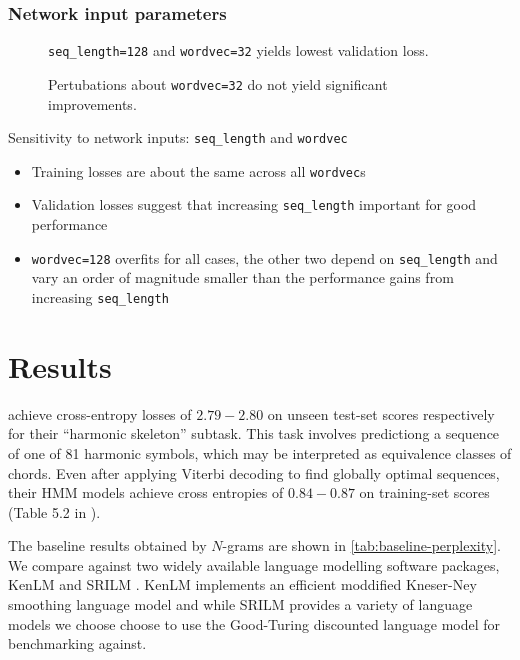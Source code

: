 \subsubsection{Network input parameters}


\begin{figure}[tb]
    \centering
    
    \caption{\texttt{seq\_length=128} and \texttt{wordvec=32} yields lowest validation loss.}
    \label{fig:torch-rnn-input-params}
\end{figure}

\begin{figure}[tb]
  \centering
  
  \caption{Pertubations about \texttt{wordvec=32} do not yield significant improvements.}
  \label{fig:torch-rnn-input-params-wordvec}
\end{figure}

Sensitivity to network inputs: \texttt{seq\_length} and \texttt{wordvec}
\begin{itemize}
    \item Training losses are about the same across all \texttt{wordvec}s
    \item Validation losses suggest that increasing \texttt{seq\_length} important for good performance 
    \item \texttt{wordvec=128} overfits for all cases, the other two depend on \texttt{seq\_length} and vary an order of magnitude smaller than the performance gains from increasing \texttt{seq\_length}
\end{itemize}

\section{Results}

\citet{Allan2005} achieve cross-entropy losses of $2.79-2.80$ on unseen
test-set scores respectively for their ``harmonic skeleton'' subtask. This task
involves predictiong a sequence of one of 81 harmonic symbols, which may be
interpreted as equivalence classes of chords. Even after applying Viterbi
decoding to find globally optimal sequences, their HMM models achieve cross
entropies of $0.84-0.87$ on training-set scores (Table 5.2 in
\citet{Allan2005}).

The baseline results obtained by $N$-grams are shown in
\vref{tab:baseline-perplexity}. We compare against two widely available
language modelling software packages, KenLM \citep{Heafield-estimate} and
SRILM \citep{stolcke2002srilm}. KenLM implements an efficient moddified
Kneser-Ney smoothing language model and while SRILM provides a variety of
language models we choose choose to use the Good-Turing discounted language
model for benchmarking against.

